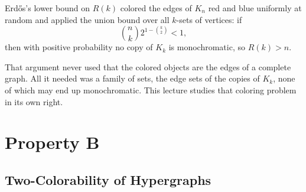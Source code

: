 
\begin{recall}
    Erd\H{o}s's lower bound on \(R(k)\) colored the edges of \(K_n\) red and blue uniformly at random and applied the union bound over all \(k\)-sets of vertices: if
    \[
        \binom{n}{k} 2^{1 - \binom{k}{2}} < 1,
    \]
    then with positive probability no copy of \(K_k\) is monochromatic, so \(R(k) > n\).
\end{recall}

That argument never used that the colored objects are the edges of a complete graph. All it needed was a family of sets, the edge sets of the copies of \(K_k\), none of which may end up monochromatic. This lecture studies that coloring problem in its own right.

\section{Property B}\label{sec:property-B}

\subsection{Two-Colorability of Hypergraphs}

